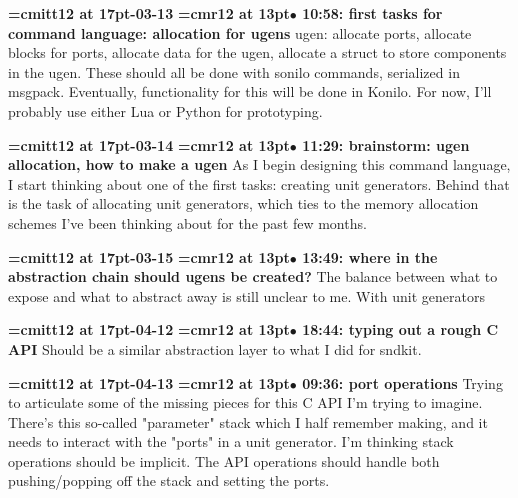 {\medskip\noindent\bf\font\titlefont=cmitt12 at 17pt-03-13}\medskip
{\smallskip\noindent\bf\font\titlefont=cmr12 at 13pt\titlefont $\bullet$ 10:58: first tasks for command language: allocation for ugens}\smallskip
ugen: allocate ports, allocate blocks for ports, allocate data for the ugen, allocate a struct to store components in the ugen. These should all be done with sonilo commands, serialized in msgpack. Eventually, functionality for this will be done in Konilo. For now, I'll probably use either Lua or Python for prototyping.
\par

{\medskip\noindent\bf\font\titlefont=cmitt12 at 17pt-03-14}\medskip
{\smallskip\noindent\bf\font\titlefont=cmr12 at 13pt\titlefont $\bullet$ 11:29: brainstorm: ugen allocation, how to make a ugen}\smallskip
As I begin designing this command language, I start thinking about one of the first tasks: creating unit generators. Behind that is the task of allocating unit generators, which ties to the memory allocation schemes I've been thinking about for the past few months.
\par

{\medskip\noindent\bf\font\titlefont=cmitt12 at 17pt-03-15}\medskip
{\smallskip\noindent\bf\font\titlefont=cmr12 at 13pt\titlefont $\bullet$ 13:49: where in the abstraction chain should ugens be created?}\smallskip
The balance between what to expose and what to abstract away is still unclear to me. With unit generators
\par

{\medskip\noindent\bf\font\titlefont=cmitt12 at 17pt-04-12}\medskip
{\smallskip\noindent\bf\font\titlefont=cmr12 at 13pt\titlefont $\bullet$ 18:44: typing out a rough C API}\smallskip
Should be a similar abstraction layer to what I did for sndkit.
\par

{\medskip\noindent\bf\font\titlefont=cmitt12 at 17pt-04-13}\medskip
{\smallskip\noindent\bf\font\titlefont=cmr12 at 13pt\titlefont $\bullet$ 09:36: port operations}\smallskip
Trying to articulate some of the missing pieces for this C API I'm trying to imagine. There's this so-called "parameter" stack which I half remember making, and it needs to interact with the "ports" in a unit generator. I'm thinking stack operations should be implicit. The API operations should handle both pushing/popping off the stack and setting the ports.
\par

